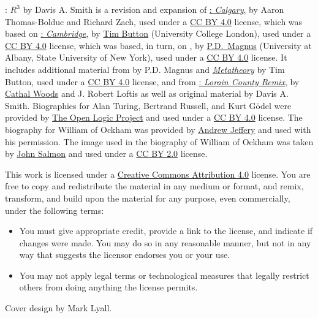 \noindent\small%
\forallx: \emph{$R^3$} by Davis A. Smith is a revision and expansion of \href{https://forallx.openlogicproject.org/}{\forallx: \emph{Calgary}}, 
by Aaron Thomas-Bolduc and Richard Zach, used under a 
\href{https://creativecommons.org/licenses/by/4.0/}{CC BY 4.0} license, which was based on
\href{https://www.homepages.ucl.ac.uk/~uctytbu/OERs.html}{\forallx:
\emph{Cambridge}}, by 
\href{https://www.homepages.ucl.ac.uk/~uctytbu/}{Tim Button} (University College London), 
used under a \href{https://creativecommons.org/licenses/by/4.0/}{CC BY
4.0} license, which was based, in turn,
on \href{https://www.fecundity.com/logic/}{\forallx}, by
\href{https://www.fecundity.com/job/}{P.D.\ Magnus} 
(University at Albany, State University of New York),
used under a \href{https://creativecommons.org/licenses/by/4.0/}{CC BY
4.0} license.
It includes additional material from \forallx{} by P.D. Magnus and
\href{https://www.homepages.ucl.ac.uk/~uctytbu/OERs.html}{\emph{Metatheory}} by Tim Button, 
used under a \href{https://creativecommons.org/licenses/by/4.0/}{CC BY
4.0} license, and 
from \href{https://github.com/rob-helpy-chalk/openintroduction}{\forallx: \emph{Lorain
County Remix}},
by \href{https://sites.google.com/site/cathalwoods/}{Cathal Woods} and
J. Robert Loftis as well as original material by Davis A. Smith. Biographies for Alan Turing, Bertrand Russell, and Kurt G\"{o}del were provided by \href{https://builds.openlogicproject.org/}{The Open Logic Project} and used under a \href{https://creativecommons.org/licenses/by/4.0/}{CC BY 4.0} license. The biography for William of Ockham was provided by \href{https://sites.google.com/view/andrewjefferyswebpage}{Andrew Jeffery} and used with his permission. The image used in the biography of William of Ockham was taken by \href{https://www.geograph.org.uk/profile/9419}{John Salmon} and used under a \href{https://creativecommons.org/licenses/by-sa/2.0/}{CC BY 2.0} license. 

\bigskip

\noindent \footnotesize This work is licensed under a \href{https://creativecommons.org/licenses/by/4.0/}{Creative Commons Attribution 4.0} license.
You are free to copy and redistribute the material in any medium or format, and  remix, transform, and build upon the material for any purpose, even commercially, under the following terms:
\begin{itemize}
\item You must give appropriate credit, provide a link to the license, and indicate if changes were made. You may do so in any reasonable manner, but not in any way that suggests the licensor endorses you or your use.
\item You may not apply legal terms or technological measures that legally restrict others from doing anything the license permits.
\end{itemize}

\bigskip
\noindent Cover design by Mark Lyall.